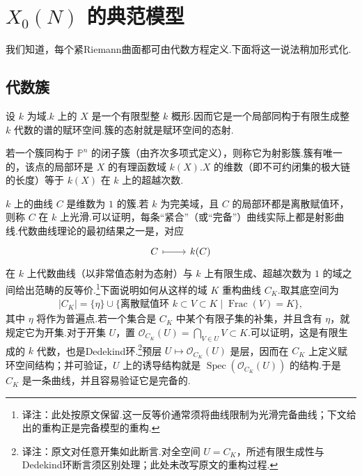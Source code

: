 
\section{\texorpdfstring{$X_0(N)$}{X₀(N)} 的典范模型}\label{sec:modular-2-3}

我们知道，每个紧Riemann曲面都可由代数方程定义.下面将这一说法稍加形式化.



\subsection{代数簇}\label{sec:modular-2-3-1}

设 $k$ 为域.$k$ 上的 $X$ 是一个有限型整 $k$ 概形.因而它是一个局部同构于有限生成整 $k$ 代数的谱的赋环空间.簇的态射就是赋环空间的态射.



若一个簇同构于 $\mathbb P^n$ 的闭子簇（由齐次多项式定义），则称它为射影簇.簇有唯一的，该点的局部环是 $X$ 的有理函数域 $k(X)$.$X$ 的维数（即不可约闭集的极大链的长度）等于 $k(X)$ 在 $k$ 上的超越次数.



$k$ 上的曲线 $C$ 是维数为 $1$ 的簇.若 $k$ 为完美域，且 $C$ 的局部环都是离散赋值环，则称 $C$ 在 $k$ 上光滑.可以证明，每条``紧合''（或``完备''）曲线实际上都是射影曲线.代数曲线理论的最初结果之一是，对应
\begin{equation*}
\begin{tikzcd}
C \arrow[r,mapsto] & k(C)
\end{tikzcd}
\end{equation*}
在 $k$ 上代数曲线（以非常值态射为态射）与 $k$ 上有限生成、超越次数为 $1$ 的域之间给出范畴的反等价.\footnote{译注：此处按原文保留.这一反等价通常须将曲线限制为光滑完备曲线；下文给出的重构正是完备模型的重构.}下面说明如何从这样的域 $K$ 重构曲线 $C_K$.取其底空间为
\begin{align*}
|C_K|=\{\eta\}\cup\{\text{离散赋值环 }k\subset V\subset K\mid\operatorname{Frac}(V)=K\},
\end{align*}
其中 $\eta$ 将作为普遍点.若一个集合是 $C_K$ 中某个有限子集的补集，并且含有 $\eta$，就规定它为开集.对于开集 $U$，置 $\mathcal O_{C_K}(U)=\bigcap_{V\in U}V\subset K$.可以证明，这是有限生成的 $k$ 代数，也是Dedekind环.\footnote{译注：原文对任意开集如此断言.对全空间 $U=C_K$，所述有限生成性与Dedekind环断言须区别处理；此处未改写原文的重构过程.}预层 $U\mapsto\mathcal O_{C_K}(U)$ 是层，因而在 $C_K$ 上定义赋环空间结构；并可验证，$U$ 上的诱导结构就是 $\operatorname{Spec}(\mathcal O_{C_K}(U))$ 的结构.于是 $C_K$ 是一条曲线，并且容易验证它是完备的.



